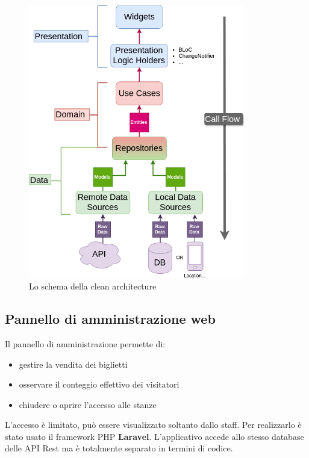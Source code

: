 \documentclass[12pt]{article}
\begin{document}
\begin{center}
    \begin{figure}[htp]
        \centering
        \includegraphics[height=12cm]{diagrams/clean_architecture.png}
        \caption{Lo schema della clean architecture}
        \label{fig:clean_architecture}
    \end{figure}
    \end{center}
    

\subsection{Pannello di amministrazione web}
Il pannello di amministrazione permette di:
\begin{itemize}
    \item gestire la vendita dei biglietti
    \item osservare il conteggio effettivo dei visitatori
    \item chiudere o aprire l’accesso alle stanze
\end{itemize}
L'accesso è limitato, può essere visualizzato soltanto dallo staff. Per realizzarlo è stato usato il framework PHP \textbf{Laravel}. L'applicativo accede allo stesso database delle API Rest ma è totalmente separato in termini di codice. 




\end{document}
